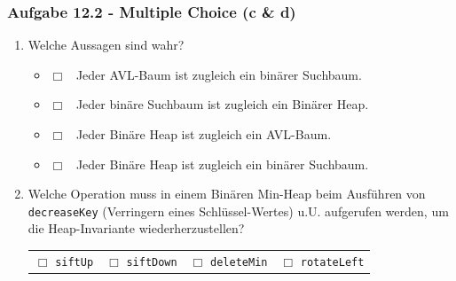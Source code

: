 \documentclass{beamer}
\begin{document}
\begin{frame}[t]
	\frametitle{Aufgabe 12.2 - Multiple Choice (c \& d)}
	\small
	\begin{enumerate}[label=\textcolor{black}{\alph*)},align=left,leftmargin=*,itemsep=2em,start=3]
		\item Welche Aussagen sind wahr? \medskip \\
		      \begin{itemize}[label={}]
			      \item $\Box$ \, Jeder AVL-Baum ist zugleich ein binärer Suchbaum.
			      \item $\Box$ \, Jeder binäre Suchbaum ist zugleich ein Binärer Heap.
			      \item $\Box$ \, Jeder Binäre Heap ist zugleich ein AVL-Baum.
			      \item $\Box$ \, Jeder Binäre Heap ist zugleich ein binärer Suchbaum.
		      \end{itemize}
		\item Welche Operation muss in einem Binären Min-Heap beim Ausführen von \lstinline{decreaseKey}
		      (Verringern eines Schlüssel-Wertes) u.U. aufgerufen werden, um die Heap-Invariante wiederherzustellen? \medskip \\
		      \begin{tabular}{llll}
			      $\Box$ \lstinline{siftUp}   &
			      $\Box$ \lstinline{siftDown} &
			      $\Box$ \lstinline{deleteMin}     &
			      $\Box$ \lstinline{rotateLeft}
		      \end{tabular}
	\end{enumerate}
\end{frame}
\end{document}

